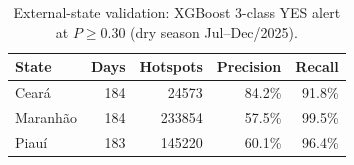 \begin{table}[htbp]
\centering
\caption{External-state validation: XGBoost 3-class YES alert at $P\geq 0.30$ (dry season Jul--Dec/2025).}
\label{tab:external-states}
\small
\begin{tabular}{@{}lrrrr@{}}
\toprule
\textbf{State} & \textbf{Days} & \textbf{Hotspots} & \textbf{Precision} & \textbf{Recall} \\
\midrule
Ceará & 184 & 24573 & 84.2\% & 91.8\% \\
Maranhão & 184 & 233854 & 57.5\% & 99.5\% \\
Piauí & 183 & 145220 & 60.1\% & 96.4\% \\
\bottomrule
\end{tabular}
\end{table}
